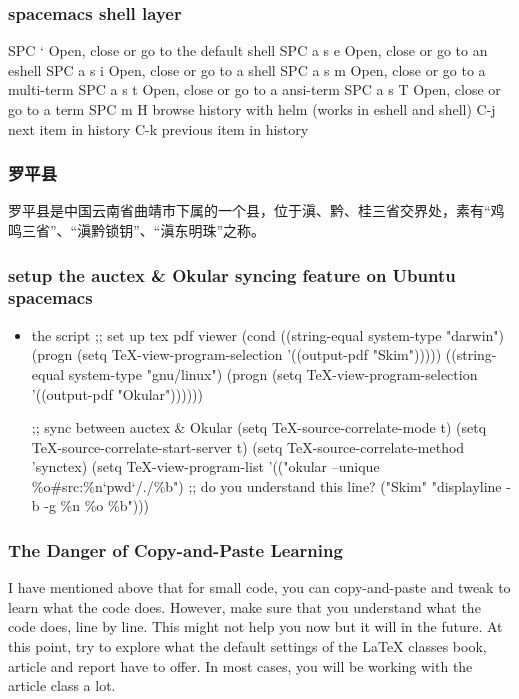 \documentclass[11pt]{article}
\begin{document}
\subsubsection*{spacemacs \textbf{shell} layer}
\label{sec:orgheadline91}
SPC ‘  Open, close or go to the default shell
SPC a s e  Open, close or go to an eshell
SPC a s i  Open, close or go to a shell
SPC a s m  Open, close or go to a multi-term
SPC a s t  Open, close or go to a ansi-term
SPC a s T  Open, close or go to a term
SPC m H  browse history with helm (works in eshell and shell)
C-j  next item in history
C-k  previous item in history
\subsubsection*{罗平县}
\label{sec:orgheadline92}
罗平县是中国云南省曲靖市下属的一个县，位于滇、黔、桂三省交界处，素有“鸡鸣三省”、“滇黔锁钥”、“滇东明珠”之称。
\subsubsection*{setup the auctex \& Okular syncing feature on Ubuntu spacemacs}
\label{sec:orgheadline94}
\begin{itemize}
\item the script
\label{sec:orgheadline93}
;; set up tex pdf viewer
(cond
 ((string-equal system-type "darwin")
  (progn (setq \TeX{}-view-program-selection '((output-pdf "Skim")))))
 ((string-equal system-type "gnu/linux")
  (progn (setq \TeX{}-view-program-selection '((output-pdf "Okular"))))))

;; sync between auctex \& Okular
(setq \TeX{}-source-correlate-mode t)
(setq \TeX{}-source-correlate-start-server t)
(setq \TeX{}-source-correlate-method 'synctex)
(setq \TeX{}-view-program-list
      '(("okular --unique \%o\#src:\%n`pwd`/./\%b")    ;; do you understand this line?
        ("Skim" "displayline -b -g \%n \%o \%b")))
\end{itemize}
\subsubsection*{The Danger of Copy-and-Paste Learning}
\label{sec:orgheadline95}
I have mentioned above that for small code, you can copy-and-paste and tweak to
learn what the code does. However, make sure that you understand what the code
does, line by line. This might not help you now but it will in the future. At
this point, try to explore what the default settings of the \LaTeX{} classes book,
article and report have to offer. In most cases, you will be working with the
article class a lot.
\end{document}
